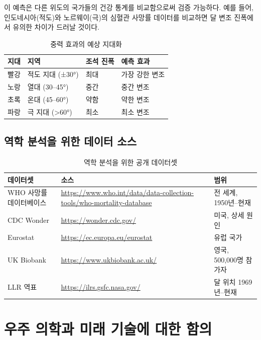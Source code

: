 \documentclass[12pt,a4paper]{article}
\theoremstyle{remark}
\begin{document}
	이 예측은 다른 위도의 국가들의 건강 통계를 비교함으로써 검증 가능하다. 예를 들어, 인도네시아(적도)와 노르웨이(극)의 심혈관 사망률 데이터를 비교하면 달 변조 진폭에서 유의한 차이가 드러날 것이다.
	
	\begin{table}[htbp]
		\centering
		\caption{중력 효과의 예상 지대화}
		\label{tab:zonation}
		\small
		\begin{tabular}{clll}
			\toprule
			\textbf{지대} & \textbf{지역} & \textbf{조석 진폭} & \textbf{예측 효과} \\
			\midrule
			빨강 & 적도 지대 (±30°) & 최대 & 가장 강한 변조 \\
			노랑 & 열대 (30–45°) & 중간 & 중간 변조 \\
			초록 & 온대 (45–60°) & 약함 & 약한 변조 \\
			파랑 & 극 지대 (>60°) & 최소 & 최소 변조 \\
			\bottomrule
		\end{tabular}
	\end{table}
	
	\subsection{역학 분석을 위한 데이터 소스}
	
	\begin{table}[htbp]
		\centering
		\caption{역학 분석을 위한 공개 데이터셋}
		\label{tab:data-sources}
		\small
		\begin{tabular}{p{3.2cm}p{6.5cm}p{2.8cm}}
			\toprule
			\textbf{데이터셋} & \textbf{소스} & \textbf{범위} \\
			\midrule
			WHO 사망률 데이터베이스 & 
			\url{https://www.who.int/data/data-collection-tools/who-mortality-database} & 
			전 세계, 1950년–현재 \\
			CDC Wonder & 
			\url{https://wonder.cdc.gov/} & 
			미국, 상세 원인 \\
			Eurostat & 
			\url{https://ec.europa.eu/eurostat} & 
			유럽 국가 \\
			UK Biobank & 
			\url{https://www.ukbiobank.ac.uk/} & 
			영국, 500,000명 참가자 \\
			LLR 역표 & 
			\url{https://ilrs.gsfc.nasa.gov/} & 
			달 위치 1969년–현재 \\
			\bottomrule
		\end{tabular}
	\end{table}
	
	\section{우주 의학과 미래 기술에 대한 함의}
	\label{sec:applications}
	
\end{document}

